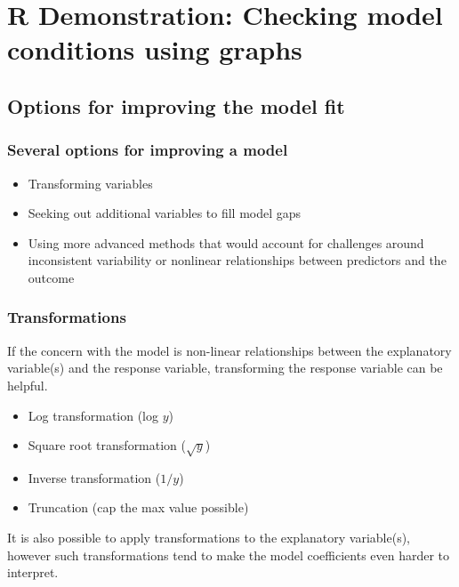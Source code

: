 \documentclass[slidestop,compress,mathserif]{beamer}
\begin{document}

\section{R Demonstration: Checking model conditions using graphs}


\subsection{Options for improving the model fit}


\begin{frame}
\frametitle{Several options for improving a model}

\begin{itemize}

\item Transforming variables
\item Seeking out additional variables to fill model gaps
\item Using more advanced methods that would account for challenges around inconsistent variability or nonlinear relationships between predictors and the outcome

\end{itemize}

\end{frame}


\begin{frame}
\frametitle{Transformations}

If the concern with the model is non-linear relationships between the explanatory 
variable(s) and the response variable, transforming the response variable can be helpful. 

\begin{itemize}

\item Log transformation (log $y$)
\item Square root transformation ($\sqrt{y}$)
\item Inverse transformation ($1/y$)
\item Truncation (cap the max value possible)

\end{itemize}

It is also possible to apply transformations to the explanatory variable(s), however 
such transformations tend to make the model coefficients even harder to interpret.

\end{frame}
\end{document}
